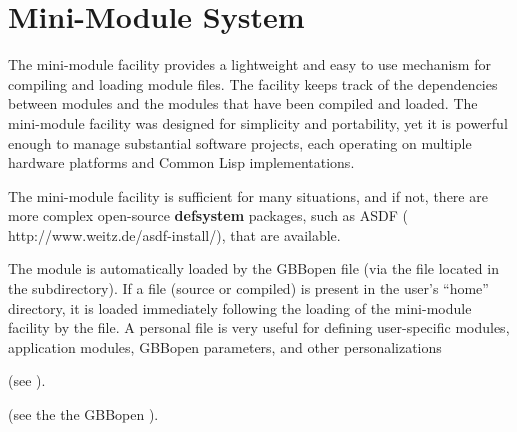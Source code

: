 \documentclass[10pt,twoside,english,pdftex]{article}
\begin{document}
\T\markright{}%
\T\pagestyle{plain}
\T\cleardoublepage
\W{}
\T\pagestyle{fancy}
\T\thispagestyle{fancybottom}
\T\global\def\fnlastname{ }%
\T\renewcommand{\headrulewidth}{0pt}
\section{Mini-Module System}
\label{sec:mini-module}%

%
%
%
%
%
%
%
%
%
The mini-module facility provides a lightweight and easy to use mechanism
for compiling and loading module files.  The facility keeps track of the
dependencies between modules and the modules that have been compiled and
loaded. The mini-module facility was designed for simplicity and
portability, yet it is powerful enough to manage substantial software
projects, each operating on multiple hardware platforms and Common Lisp
implementations.

The mini-module facility is sufficient for many situations, and if not,
there are more complex open-source \textbf{defsystem} packages, such as ASDF
(%
{http://www.weitz.de/asdf-install/}), that are available.

%
%
%
%
%
The  module is automatically loaded by the GBBopen
\mbox{} file (via the
 file located in the 
subdirectory). If a  file (source or compiled)
is present in the user's ``home'' directory, it is loaded immediately
following the loading of the mini-module facility by the
 file.  A personal  file is
very useful for defining user-specific modules, application modules,
GBBopen parameters, and other personalizations
\W\begin{iftex}
  (see ).
\W\end{iftex}
\T\begin{ifhtml}
  (see the the GBBopen ).
\T\end{ifhtml}
\end{document}
